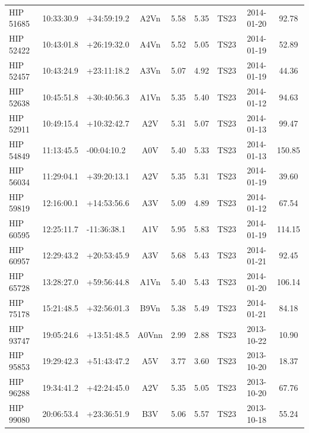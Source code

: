 \begin{scriptsize}
\begin{longtable}{lllcccrcc}
   HIP 51685 &  10:33:30.9 &  +34:59:19.2 &           A2Vn &     5.58 &     5.35 &       TS23 &  2014-01-20 &           92.78 \\
   HIP 52422 &  10:43:01.8 &  +26:19:32.0 &           A4Vn &     5.52 &     5.05 &       TS23 &  2014-01-19 &           52.89 \\
   HIP 52457 &  10:43:24.9 &  +23:11:18.2 &           A3Vn &     5.07 &     4.92 &       TS23 &  2014-01-19 &           44.36 \\
   HIP 52638 &  10:45:51.8 &  +30:40:56.3 &           A1Vn &     5.35 &     5.40 &       TS23 &  2014-01-12 &           94.63 \\
   HIP 52911 &  10:49:15.4 &  +10:32:42.7 &            A2V &     5.31 &     5.07 &       TS23 &  2014-01-13 &           99.47 \\
   HIP 54849 &  11:13:45.5 &  -00:04:10.2 &            A0V &     5.40 &     5.33 &       TS23 &  2014-01-13 &          150.85 \\
   HIP 56034 &  11:29:04.1 &  +39:20:13.1 &            A2V &     5.35 &     5.31 &       TS23 &  2014-01-19 &           39.60 \\
   HIP 59819 &  12:16:00.1 &  +14:53:56.6 &            A3V &     5.09 &     4.89 &       TS23 &  2014-01-12 &           67.54 \\
   HIP 60595 &  12:25:11.7 &  -11:36:38.1 &            A1V &     5.95 &     5.83 &       TS23 &  2014-01-19 &          114.15 \\
   HIP 60957 &  12:29:43.2 &  +20:53:45.9 &            A3V &     5.68 &     5.43 &       TS23 &  2014-01-21 &           92.45 \\
   HIP 65728 &  13:28:27.0 &  +59:56:44.8 &           A1Vn &     5.40 &     5.43 &       TS23 &  2014-01-20 &          106.14 \\
   HIP 75178 &  15:21:48.5 &  +32:56:01.3 &           B9Vn &     5.38 &     5.49 &       TS23 &  2014-01-21 &           84.18 \\
   HIP 93747 &  19:05:24.6 &  +13:51:48.5 &       A0Vnn &     2.99 &     2.88 &       TS23 &  2013-10-22 &           10.90 \\
   HIP 95853 &  19:29:42.3 &  +51:43:47.2 &            A5V &     3.77 &     3.60 &       TS23 &  2013-10-20 &           18.37 \\
   HIP 96288 &  19:34:41.2 &  +42:24:45.0 &            A2V &     5.35 &     5.05 &       TS23 &  2013-10-20 &           67.76 \\
   HIP 99080 &  20:06:53.4 &  +23:36:51.9 &            B3V &     5.06 &     5.57 &       TS23 &  2013-10-18 &           55.24 \\

\end{longtable}
\end{scriptsize}

